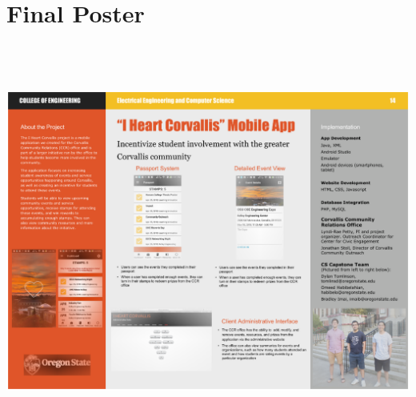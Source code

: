 \documentclass[onecolumn, draftclsnofoot,10pt, compsoc]{IEEEtran}
\begin{document}
  \newpage

\section{Final Poster}
  \includegraphics[height=13cm]{poster}
  \newpage
\end{document}
